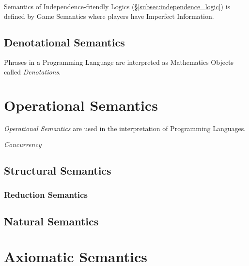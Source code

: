 \documentclass{article}
\begin{document}
Semantics of Independence-friendly Logics
(\S\ref{subsec:independence_logic}) is defined by Game Semantics where
players have Imperfect Information.

\subsection{Denotational Semantics}

Phrases in a Programming Language are interpreted as Mathematics
Objects called \emph{Denotations}.

\section{Operational Semantics}

\emph{Operational Semantics} are used in the interpretation of
Programming Languages.

\emph{Concurrency}

\subsection{Structural Semantics}

\subsubsection{Reduction Semantics}

\subsection{Natural Semantics}

\section{Axiomatic Semantics}
\end{document}
